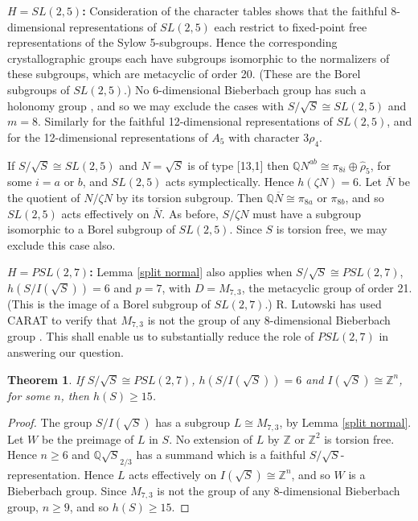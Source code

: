 \documentclass[12pt]{amsart}
\renewcommand{\geq}{\geqslant}
\newtheorem{theorem}{Theorem}
\begin{document}
\noindent$H=SL(2,5)${\bf :}
Consideration of the character tables shows that
the faithful 8-dimensional representations of $SL(2,5)$ 
each restrict to fixed-point free representations of the Sylow 5-subgroups.
Hence the corresponding crystallographic groups each have subgroups isomorphic 
to  the normalizers of these subgroups, which are metacyclic of order 20.
(These are the Borel subgroups of $SL(2,5)$.)
No 6-dimensional Bieberbach group has such a holonomy group  \cite{CS},
and so we may exclude the cases with $S/\sqrt{S}\cong{SL(2,5)}$ and $m=8$.
Similarly for the faithful 12-dimensional representations of $SL(2,5)$,
and for the 12-dimensional representations of $A_5$ with character $3\rho_4$.

If $S/\sqrt{S}\cong{SL(2,5)}$ and $N=\sqrt{S}$ is of type [13,1] then
$\mathbb{Q}N^{ab}\cong\pi_{8i}\oplus\hat\rho_5$,  for some $i=a$ or $b$,
and $SL(2,5)$ acts symplectically.
Hence $h(\zeta{N})=6$.
Let $\overline{N}$ be the quotient of $N/\zeta{N}$ by its torsion subgroup.
Then $\mathbb{Q}\overline{N}\cong\pi_{8a}$ or $\pi_{8b}$,
and so $SL(2,5)$ acts effectively on $\overline{N}$.
As before, $S/\zeta{N}$ must have a subgroup isomorphic to a Borel
subgroup of $SL(2,5)$.
Since $S$ is torsion free, we may exclude this case also.

\medskip
\noindent$H=PSL(2,7)${\bf :}
Lemma \ref{split normal} also applies when $S/\sqrt{S}\cong{PSL(2,7)}$,
$h(S/I(\sqrt{S}))=6$ and $p=7$, 
with $D=M_{7,3}$, the metacyclic group of order 21.
(This is the image of a Borel subgroup of $SL(2,7)$.)
R. Lutowski has used CARAT to verify that $M_{7,3}$ is not 
the group of any 8-dimensional Bieberbach group \cite{Lu23}.
This shall enable us to substantially reduce the role of $PSL(2,7)$
in answering our question.

\begin{theorem}
\label{no7}
If $S/\sqrt{S}\cong{PSL(2,7)}$,
$h(S/I(\sqrt{S}))=6$ and $I(\sqrt{S})\cong\mathbb{Z}^n$, for some $n$,
then $h(S)\geq15$.
\end{theorem}

\begin{proof}
The group $S/I(\sqrt{S})$ has a subgroup $L\cong{M_{7,3}}$, 
by Lemma \ref{split normal}.
Let $W$ be the preimage of $L$ in $S$.
No extension of $L$ by $\mathbb{Z}$ or $\mathbb{Z}^2$ is torsion free.
Hence $n\geq6$ and $\mathbb{Q}\sqrt{S}_{2/3}$ has a summand
which is a faithful $S/\sqrt{S}$-representation.
Hence $L$ acts effectively on $I(\sqrt{S})\cong\mathbb{Z}^n$,
and so $W$ is a Bieberbach group.
Since $M_{7,3}$ is not the group of any 8-dimensional Bieberbach group,
$n\geq9$,  and so $h(S)\geq15$.
\end{proof}
\end{document}
